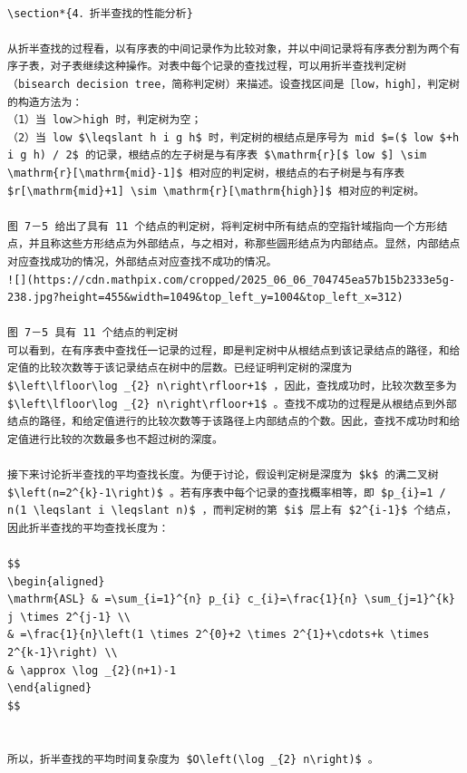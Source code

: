 \documentclass[10pt]{article}
\begin{document}
\begin{verbatim}

\section*{4．折半查找的性能分析}

从折半查找的过程看，以有序表的中间记录作为比较对象，并以中间记录将有序表分割为两个有序子表，对子表继续这种操作。对表中每个记录的查找过程，可以用折半查找判定树（bisearch decision tree，简称判定树）来描述。设查找区间是［low，high］，判定树的构造方法为：
（1）当 low＞high 时，判定树为空；
（2）当 low $\leqslant h i g h$ 时，判定树的根结点是序号为 mid $=($ low $+h i g h) / 2$ 的记录，根结点的左子树是与有序表 $\mathrm{r}[$ low $] \sim \mathrm{r}[\mathrm{mid}-1]$ 相对应的判定树，根结点的右子树是与有序表 $r[\mathrm{mid}+1] \sim \mathrm{r}[\mathrm{high}]$ 相对应的判定树。

图 7－5 给出了具有 11 个结点的判定树，将判定树中所有结点的空指针域指向一个方形结点，并且称这些方形结点为外部结点，与之相对，称那些圆形结点为内部结点。显然，内部结点对应查找成功的情况，外部结点对应查找不成功的情况。
![](https://cdn.mathpix.com/cropped/2025_06_06_704745ea57b15b2333e5g-238.jpg?height=455&width=1049&top_left_y=1004&top_left_x=312)

图 7－5 具有 11 个结点的判定树
可以看到，在有序表中查找任一记录的过程，即是判定树中从根结点到该记录结点的路径，和给定值的比较次数等于该记录结点在树中的层数。已经证明判定树的深度为 $\left\lfloor\log _{2} n\right\rfloor+1$ ，因此，查找成功时，比较次数至多为 $\left\lfloor\log _{2} n\right\rfloor+1$ 。查找不成功的过程是从根结点到外部结点的路径，和给定值进行的比较次数等于该路径上内部结点的个数。因此，查找不成功时和给定值进行比较的次数最多也不超过树的深度。

接下来讨论折半查找的平均查找长度。为便于讨论，假设判定树是深度为 $k$ 的满二叉树 $\left(n=2^{k}-1\right)$ 。若有序表中每个记录的查找概率相等，即 $p_{i}=1 / n(1 \leqslant i \leqslant n)$ ，而判定树的第 $i$ 层上有 $2^{i-1}$ 个结点，因此折半查找的平均查找长度为：

$$
\begin{aligned}
\mathrm{ASL} & =\sum_{i=1}^{n} p_{i} c_{i}=\frac{1}{n} \sum_{j=1}^{k} j \times 2^{j-1} \\
& =\frac{1}{n}\left(1 \times 2^{0}+2 \times 2^{1}+\cdots+k \times 2^{k-1}\right) \\
& \approx \log _{2}(n+1)-1
\end{aligned}
$$


所以，折半查找的平均时间复杂度为 $O\left(\log _{2} n\right)$ 。


\end{verbatim}
\end{document}
